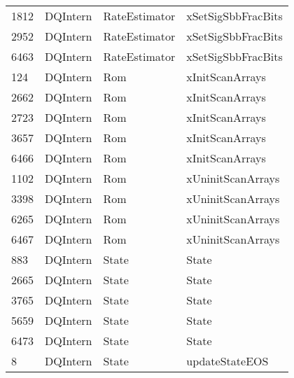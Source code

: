 \begin{tabular}{llll}
1812 &              DQIntern &              RateEstimator &                        xSetSigSbbFracBits \\
2952 &              DQIntern &              RateEstimator &                        xSetSigSbbFracBits \\
6463 &              DQIntern &              RateEstimator &                        xSetSigSbbFracBits \\
124  &              DQIntern &                        Rom &                           xInitScanArrays \\
2662 &              DQIntern &                        Rom &                           xInitScanArrays \\
2723 &              DQIntern &                        Rom &                           xInitScanArrays \\
3657 &              DQIntern &                        Rom &                           xInitScanArrays \\
6466 &              DQIntern &                        Rom &                           xInitScanArrays \\
1102 &              DQIntern &                        Rom &                         xUninitScanArrays \\
3398 &              DQIntern &                        Rom &                         xUninitScanArrays \\
6265 &              DQIntern &                        Rom &                         xUninitScanArrays \\
6467 &              DQIntern &                        Rom &                         xUninitScanArrays \\
883  &              DQIntern &                      State &                                     State \\
2665 &              DQIntern &                      State &                                     State \\
3765 &              DQIntern &                      State &                                     State \\
5659 &              DQIntern &                      State &                                     State \\
6473 &              DQIntern &                      State &                                     State \\
8    &              DQIntern &                      State &                            updateStateEOS \\

\end{tabular}
